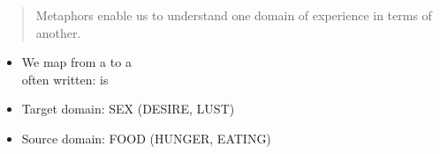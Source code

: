 \documentclass[a4paper,landscape,headrule,footrule,xetex]{foils}
\begin{document}

\begin{quote}
 Metaphors enable us to understand one
  domain of experience in terms of another.
\hfill \citet{Lakoff:Turner:1989}
\end{quote}

\begin{itemize}
\item We map from a  to a 
\\[1.5ex] often written:  is 
\end{itemize}





\begin{exe}
  \ex {}  
  \ex {}
  \ex {} 
  \ex {}
  \ex {}
\end{exe}
\begin{itemize}
\item Target domain: SEX (DESIRE, LUST)
\item Source domain: FOOD (HUNGER, EATING)
\end{itemize}


\end{document}
